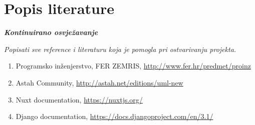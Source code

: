 \chapter*{Popis literature}
	 	
 		\textbf{\textit{Kontinuirano osvježavanje}}
	
		\textit{Popisati sve reference i literaturu koja je pomogla pri ostvarivanju projekta.}
		
		
		\begin{enumerate}
			
			
			\item  Programsko inženjerstvo, FER ZEMRIS, \url{http://www.fer.hr/predmet/proinz}
			
			\item  Astah Community, \url{http://astah.net/editions/uml-new}
			
			\item  Nuxt documentation, \url{https://nuxtjs.org/}
			
			\item  Django documentation, \url{https://docs.djangoproject.com/en/3.1/}
		\end{enumerate}
		
		 